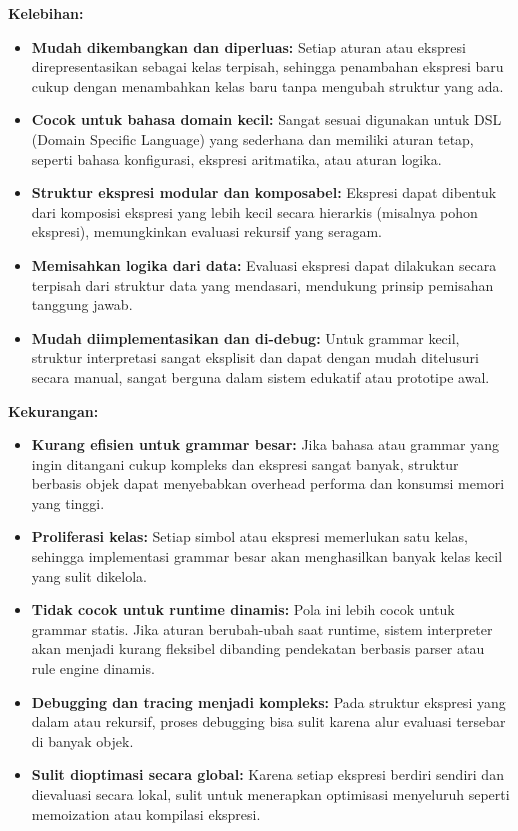 \textbf{Kelebihan:}
\begin{itemize}
	\item \textbf{Mudah dikembangkan dan diperluas:} Setiap aturan atau ekspresi direpresentasikan sebagai kelas terpisah, sehingga penambahan ekspresi baru cukup dengan menambahkan kelas baru tanpa mengubah struktur yang ada.
	
	\item \textbf{Cocok untuk bahasa domain kecil:} Sangat sesuai digunakan untuk DSL (Domain Specific Language) yang sederhana dan memiliki aturan tetap, seperti bahasa konfigurasi, ekspresi aritmatika, atau aturan logika.
	
	\item \textbf{Struktur ekspresi modular dan komposabel:} Ekspresi dapat dibentuk dari komposisi ekspresi yang lebih kecil secara hierarkis (misalnya pohon ekspresi), memungkinkan evaluasi rekursif yang seragam.
	
	\item \textbf{Memisahkan logika dari data:} Evaluasi ekspresi dapat dilakukan secara terpisah dari struktur data yang mendasari, mendukung prinsip pemisahan tanggung jawab.
	
	\item \textbf{Mudah diimplementasikan dan di-debug:} Untuk grammar kecil, struktur interpretasi sangat eksplisit dan dapat dengan mudah ditelusuri secara manual, sangat berguna dalam sistem edukatif atau prototipe awal.
\end{itemize}

\textbf{Kekurangan:}
\begin{itemize}
	\item \textbf{Kurang efisien untuk grammar besar:} Jika bahasa atau grammar yang ingin ditangani cukup kompleks dan ekspresi sangat banyak, struktur berbasis objek dapat menyebabkan overhead performa dan konsumsi memori yang tinggi.
	
	\item \textbf{Proliferasi kelas:} Setiap simbol atau ekspresi memerlukan satu kelas, sehingga implementasi grammar besar akan menghasilkan banyak kelas kecil yang sulit dikelola.
	
	\item \textbf{Tidak cocok untuk runtime dinamis:} Pola ini lebih cocok untuk grammar statis. Jika aturan berubah-ubah saat runtime, sistem interpreter akan menjadi kurang fleksibel dibanding pendekatan berbasis parser atau rule engine dinamis.
	
	\item \textbf{Debugging dan tracing menjadi kompleks:} Pada struktur ekspresi yang dalam atau rekursif, proses debugging bisa sulit karena alur evaluasi tersebar di banyak objek.
	
	\item \textbf{Sulit dioptimasi secara global:} Karena setiap ekspresi berdiri sendiri dan dievaluasi secara lokal, sulit untuk menerapkan optimisasi menyeluruh seperti memoization atau kompilasi ekspresi.
\end{itemize}

